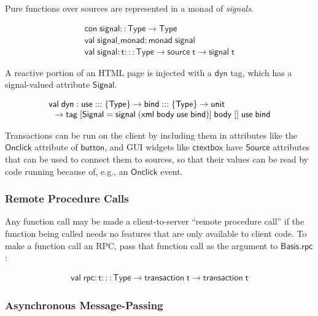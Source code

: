 \documentclass{article}
\newcommand{\mt}[1]{\mathsf{#1}}
\begin{document}
Pure functions over sources are represented in a monad of \emph{signals}.

$$\begin{array}{l}
  \mt{con} \; \mt{signal} :: \mt{Type} \to \mt{Type} \\
  \mt{val} \; \mt{signal\_monad} : \mt{monad} \; \mt{signal} \\
  \mt{val} \; \mt{signal} : \mt{t} ::: \mt{Type} \to \mt{source} \; \mt{t} \to \mt{signal} \; \mt{t}
\end{array}$$

A reactive portion of an HTML page is injected with a $\mt{dyn}$ tag, which has a signal-valued attribute $\mt{Signal}$.

$$\begin{array}{l}
  \mt{val} \; \mt{dyn} : \mt{use} ::: \{\mt{Type}\} \to \mt{bind} ::: \{\mt{Type}\} \to \mt{unit} \\
  \hspace{.1in} \to \mt{tag} \; [\mt{Signal} = \mt{signal} \; (\mt{xml} \; \mt{body} \; \mt{use} \; \mt{bind})] \; \mt{body} \; [] \; \mt{use} \; \mt{bind}
\end{array}$$

Transactions can be run on the client by including them in attributes like the $\mt{Onclick}$ attribute of $\mt{button}$, and GUI widgets like $\mt{ctextbox}$ have $\mt{Source}$ attributes that can be used to connect them to sources, so that their values can be read by code running because of, e.g., an $\mt{Onclick}$ event.

\subsubsection{Remote Procedure Calls}

Any function call may be made a client-to-server ``remote procedure call'' if the function being called needs no features that are only available to client code.  To make a function call an RPC, pass that function call as the argument to $\mt{Basis.rpc}$:

$$\begin{array}{l}
  \mt{val} \; \mt{rpc} : \mt{t} ::: \mt{Type} \to \mt{transaction} \; \mt{t} \to \mt{transaction} \; \mt{t}
\end{array}$$

\subsubsection{Asynchronous Message-Passing}
\end{document}

